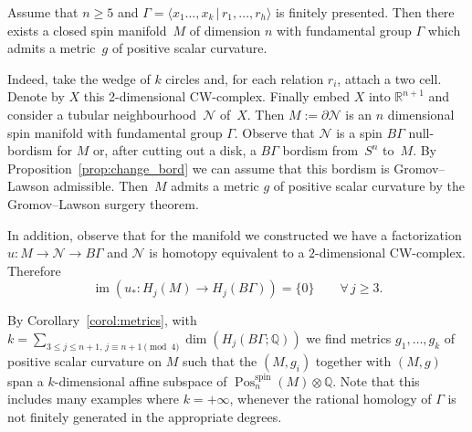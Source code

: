 \documentclass[10pt,a4paper]{amsart}
\numberwithin{equation}{section}
\def\QQ{\ensuremath{\mathbb{Q}}}
\def\RR{\ensuremath{\mathbb{R}}}
\newcommand{\rationals}{\mathbb{Q}}
\newcommand{\tensor}{\otimes}
\DeclareMathOperator{\Pos}{Pos}
\DeclareMathOperator{\im}{im}
\DeclareMathOperator{\spin}{spin}
\begin{document}
\begin{Example}\label{ex:given_pi1}
 Assume that $n\ge 5$ and $\Gamma=\langle x_1\dots,x_k\,|\,
 r_1,\dots,r_h\rangle$ is finitely presented. Then there
 exists a closed spin manifold~$M$ of dimension $n$ with fundamental group
 $\Gamma$ which admits a metric~$g$ of positive scalar curvature.

 Indeed, take the wedge of $k$ circles and, for each relation
 $r_i$, attach a two cell. Denote by $X$ this 2-dimensional CW-complex. Finally
 embed $X$ into $\RR^{n+1}$ and consider a
 tubular neighbour\-hood~$\mathcal{N}$ of~$X$. Then
 $M:=\partial\mathcal{N}$ is an $n$ dimensional spin manifold
 with fundamental group $\Gamma$. Observe that $\mathcal{N}$ is
 a spin $B\Gamma$ null-bordism for $M$ or, after cutting out a disk, a
 $B\Gamma$ bordism from~$S^n$ to~$M$. By Proposition~\ref{prop:change_bord} we can
 assume that this bordism is Gromov--Lawson admissible. Then~$M$ admits a metric
 $g$ of positive scalar curvature by the Gromov--Lawson
 surgery theorem.

 In addition, observe that for the manifold we constructed we have a
 factorization $u\colon M\to \mathcal{N}\to B\Gamma$ and $\mathcal{N}$ is
 homotopy equivalent to a $2$-dimensional CW-complex. Therefore
 \begin{equation*}
 \im(u_*\colon H_j(M)\to H_j(B\Gamma))=\{0\}\qquad\forall\, j\ge 3.
 \end{equation*}

 By Corollary~\ref{corol:metrics}, with $k= \sum_{3\le j\le n+1,\, j\equiv
 n+1\pmod 4} \dim(H_j(B\Gamma;\QQ))$ we find metrics $g_1,\dots,g_k$ of
 positive scalar curvature on $M$ such that the $(M,g_i)$ together with $(M,g)$
 span a $k$-dimensional affine subspace of
 $\Pos^{\spin}_n(M)\tensor\rationals$. Note that this includes many examples
 where $k=+\infty$, whenever the rational homology of $\Gamma$ is not finitely
 generated in the appropriate degrees.
\end{Example}
\end{document}
